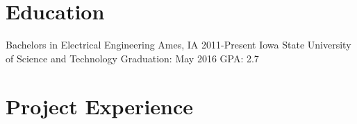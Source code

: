 \documentclass[]{friggeri-cv} %
\begin{document}
\section{Education}
\begin{entrylist}
\entry
{Bachelors in Electrical Engineering}
{Ames, IA}
{2011-Present}
{Iowa State University of Science and Technology}
{Graduation: May 2016 \newline
GPA: 2.7}

\end{entrylist}

\section{\sc Project Experience}
\end{document}
